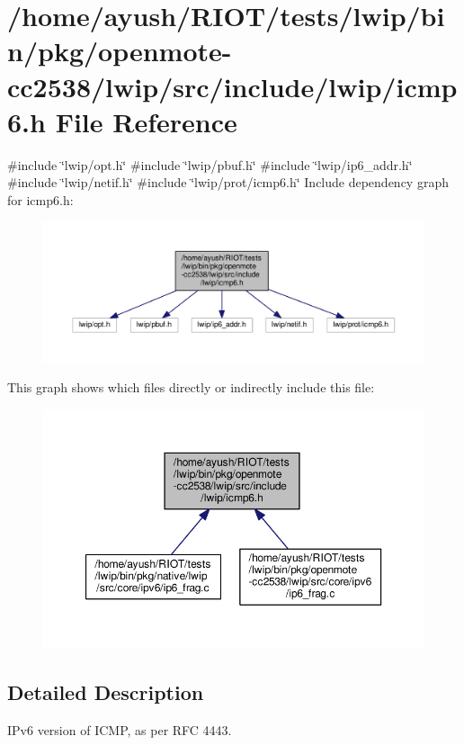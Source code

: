 \hypertarget{openmote-cc2538_2lwip_2src_2include_2lwip_2icmp6_8h}{}\section{/home/ayush/\+R\+I\+O\+T/tests/lwip/bin/pkg/openmote-\/cc2538/lwip/src/include/lwip/icmp6.h File Reference}
\label{openmote-cc2538_2lwip_2src_2include_2lwip_2icmp6_8h}
{\ttfamily \#include \char`\"{}lwip/opt.\+h\char`\"{}}\newline
{\ttfamily \#include \char`\"{}lwip/pbuf.\+h\char`\"{}}\newline
{\ttfamily \#include \char`\"{}lwip/ip6\+\_\+addr.\+h\char`\"{}}\newline
{\ttfamily \#include \char`\"{}lwip/netif.\+h\char`\"{}}\newline
{\ttfamily \#include \char`\"{}lwip/prot/icmp6.\+h\char`\"{}}\newline
Include dependency graph for icmp6.\+h\+:
\nopagebreak
\begin{figure}[H]
\begin{center}
\leavevmode
\includegraphics[width=350pt]{openmote-cc2538_2lwip_2src_2include_2lwip_2icmp6_8h__incl}
\end{center}
\end{figure}
This graph shows which files directly or indirectly include this file\+:
\nopagebreak
\begin{figure}[H]
\begin{center}
\leavevmode
\includegraphics[width=350pt]{openmote-cc2538_2lwip_2src_2include_2lwip_2icmp6_8h__dep__incl}
\end{center}
\end{figure}


\subsection{Detailed Description}
I\+Pv6 version of I\+C\+MP, as per R\+FC 4443. 